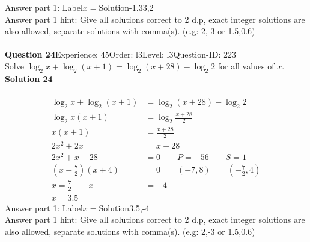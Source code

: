 \documentclass{article}
\begin{document}
Answer part 1: \hspace{10pt}Label\hspace{10pt}$x=$\hspace{10pt}Solution\hspace{10pt}-1.33,2\\
Answer part 1 hint: \hspace{15pt} Give all solutions correct to 2 d.p, exact integer solutions are also allowed, separate solutions with comma(s). (e.g: 2,-3 or 1.5,0.6)\\
\\[4pt]
\noindent\textbf{Question 24}\hspace{20pt}Experience: 45\hspace{20pt}Order: l3\hspace{20pt}Level: l3\hspace{20pt}Question-ID: 223\\[2pt]
Solve $\log_{2}x+\log_{2}(x+1)=\log_{2}(x+28)-\log_{2}2$ for all values of $x$.\\[4pt]
\noindent\textbf{Solution 24}\\[2pt]
\\[-35pt]\begin{align*}
\log_{2}x+\log_{2}(x+1)&=\log_{2}(x+28)-\log_{2}2\\[2pt]
\log_{2}x(x+1)&=\log_{2}\displaystyle\frac{x+28}{2}\\[2pt]
x(x+1)&=\displaystyle\frac{x+28}{2}\\[2pt]
2x^2+2x&=x+28\\[2pt]
2x^2+x-28&=0\qquad P=-56 \qquad S=1\\[2pt]
\left(x-\displaystyle\frac{7}{2}\right)(x+4)&=0\qquad (-7,8) \qquad \left(-\displaystyle\frac{7}{2},4\right)\\[2pt]
x=\displaystyle\frac{7}{2}\qquad x&=-4\\[2pt]
x=3.5\hspace{21pt}&
\end{align*}
Answer part 1: \hspace{10pt}Label\hspace{10pt}$x=$\hspace{10pt}Solution\hspace{10pt}3.5,-4\\
Answer part 1 hint: \hspace{15pt} Give all solutions correct to 2 d.p, exact integer solutions are also allowed, separate solutions with comma(s). (e.g: 2,-3 or 1.5,0.6)\\
\\[4pt]
\end{document}
